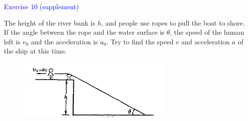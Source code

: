 \documentclass{beamer}
\begin{document}
\begin{frame}
\textcolor{blue}{Exercise 10 (supplement)}

The height of the river bank is $h$, and people use ropes to pull the boat to shore. If the angle between the rope and the water surface is $\theta$, the speed of the human left is $v_0$ and the acceleration is $a_0$. Try to find the speed $v$ and acceleration $a$ of the ship at this time.
\begin{figure}[htbp]
\centering
\includegraphics[width=0.5 \linewidth, angle =0]{ex10.png}
\label{fig:5}
\end{figure}
\end{frame}




\end{document}
